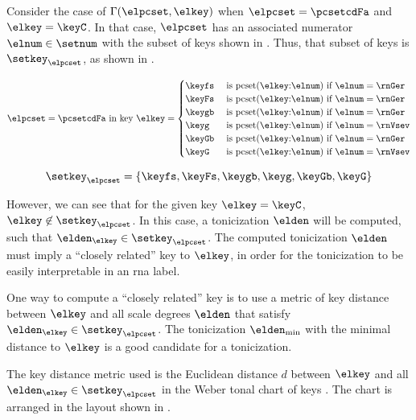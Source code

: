 
Consider the case of $\Gamma(\elpcset, \elkey)$ when
$\elpcset = \pcsetcdFa$ and $\elkey = \keyC$. In that case,
$\elpcset$ has an associated numerator $\elnum \in \setnum$
with the subset of keys shown in .
Thus, that subset of keys is $\setkey_\elpcset$, as shown in
. 

\begin{equation}
    \label{eq:key_not_found}
    \elpcset = \pcsetcdFa \text{ in key } \elkey =
    \begin{cases}
        \keyfs & \text{ is pcset}(\elkey\text{:}\elnum)\text{ if } \elnum = \rnGer \\
        \keyFs & \text{ is pcset}(\elkey\text{:}\elnum)\text{ if } \elnum = \rnGer \\
        \keygb & \text{ is pcset}(\elkey\text{:}\elnum)\text{ if } \elnum = \rnGer \\
        \keyg  & \text{ is pcset}(\elkey\text{:}\elnum)\text{ if } \elnum = \rnVsev \\
        \keyGb & \text{ is pcset}(\elkey\text{:}\elnum)\text{ if } \elnum = \rnGer \\
        \keyG  & \text{ is pcset}(\elkey\text{:}\elnum)\text{ if } \elnum = \rnVsev \\
    \end{cases}
\end{equation}

\begin{equation}
    \label{eq:key_not_found2}
    \setkey_\elpcset = \{ \keyfs, \keyFs, \keygb, \keyg, \keyGb, \keyG \}
\end{equation}

However, we can see that for the given key $\elkey = \keyC$,
$\elkey \not\in \setkey_\elpcset$. In this case, a
tonicization $\elden$ will be computed, such that
$\elden_\elkey \in \setkey_\elpcset$. The computed
tonicization $\elden$ must imply a ``closely related'' key
to $\elkey$, in order for the tonicization to be easily
interpretable in an \gls{rna} label.

One way to compute a ``closely related'' key is to use a
metric of key distance between $\elkey$ and all scale
degrees $\elden$ that satisfy $\elden_\elkey \in
\setkey_\elpcset$. The tonicization $\elden_{\min}$ with the
minimal distance to $\elkey$ is a good candidate for a
tonicization.

The key distance metric used is the Euclidean distance $d$
between $\elkey$ and all $\elden_\elkey \in
\setkey_\elpcset$ in the Weber tonal chart of keys
\parencite{weber1818versuch}. The chart is arranged in the
layout shown in .

